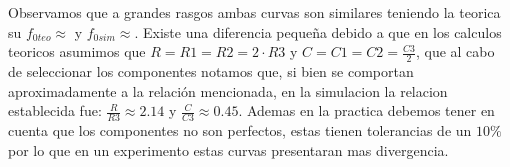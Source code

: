 
Observamos que a grandes rasgos ambas curvas son similares teniendo la teorica su $f_{0teo} \approx $ y $f_{0sim} \approx $. Existe una diferencia pequeña debido a que en los calculos teoricos asumimos que $R = R1 = R2 = 2 \cdot R3$ y $C = C1 = C2 = \frac{C3}{2}$, que al cabo de seleccionar los componentes notamos que, si bien se comportan aproximadamente a la relación mencionada, en la simulacion la relacion establecida fue: $\frac{R}{R3} \approx 2.14$ y $\frac{C}{C3} \approx 0.45$. Ademas en la practica debemos tener en cuenta que los componentes no son perfectos, estas tienen tolerancias de un $10\%$ por lo que en un experimento estas curvas presentaran mas divergencia. 
